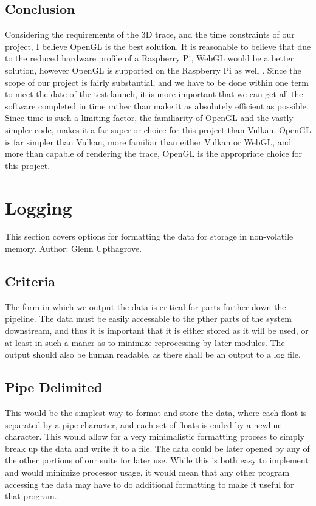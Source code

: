\documentclass[onecolumn, draftclsnofoot,10pt, compsoc]{IEEEtran}
\begin{document}
\subsection{Conclusion}
Considering the requirements of the 3D trace, and the time constraints of our project, I believe OpenGL is the best solution. It is reasonable to believe that due to the reduced hardware profile of a Raspberry Pi, WebGL would be a better solution, however OpenGL is supported on the Raspberry Pi as well \cite{refpiii}. Since the scope of our project is fairly substantial, and we have to be done within one term to meet the date of the test launch, it is more important that we can get all the software completed in time rather than make it as absolutely efficient as possible. Since time is such a limiting factor, the familiarity of OpenGL and the vastly simpler code, makes it a far superior choice for this project than Vulkan. OpenGL is far simpler than Vulkan, more familiar than either Vulkan or WebGL, and more than capable of rendering the trace, OpenGL is the appropriate choice for this project\cite{refgs}. 

\section{Logging}
This section covers options for formatting the data for storage in non-volatile memory. Author: Glenn Upthagrove. 
\subsection{Criteria} 
The form in which we output the data is critical for parts further down the pipeline. The data must be easily accessable to the pther parts of the system downstream, and thus it is important that it is either stored as it will be used, or at least in such a maner as to minimize reprocessing by later modules. The output should also be human readable, as there shall be an output to a log file. 
\subsection{Pipe Delimited}
This would be the simplest way to format and store the data, where each float is separated by a pipe character, and each set of floats is ended by a newline character. This would allow for a very minimalistic formatting process to simply break up the data and write it to a file. The data could be later opened by any of the other portions of our suite for later use. While this is both easy to implement and would minimize processor usage, it would mean that any other program accessing the data may have to do additional formatting to make it useful for that program. 
\end{document}
